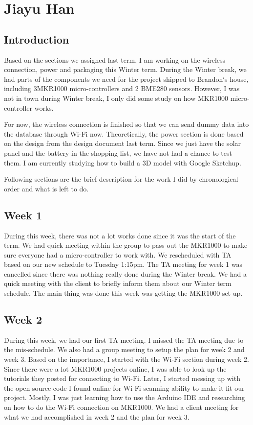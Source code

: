 \documentclass[IEEEtran,letterpaper,10pt,titlepage,fleqn,draftclsnofoot,onecolumn]{article}
\begin{document}
\section{Jiayu Han}
\subsection{Introduction}

Based on the sections we assigned last term, I am working on the wireless connection, power and packaging this Winter term. During the Winter break, we had parts of the components we need for the project shipped to Brandon`s house, including 3MKR1000 micro-controllers and 2 BME280 sensors. However, I was not in town during Winter break, I only did some study on how MKR1000 micro-controller works. 

For now, the wireless connection is finished so that we can send dummy data into the database through Wi-Fi now. Theoretically, the power section is done based on the design from the design document last term. Since we just have the solar panel and the battery in the shopping list, we have not had a chance to test them. I am currently studying how to build a 3D model with Google Sketchup.  

Following sections are the brief description for the work I did by chronological order and what is left to do.

\subsection{Week 1}

During this week, there was not a lot works done since it was the start of the term. We had quick meeting within the group to pass out the MKR1000 to make sure everyone had a micro-controller to work with. We rescheduled with TA based on our new schedule to Tuesday 1:15pm. The TA meeting for week 1 was cancelled since there was nothing really done during the Winter break. We had a quick meeting with the client to briefly inform them about our Winter term schedule. The main thing was done this week was getting the MKR1000 set up.

\subsection{Week 2}

During this week, we had our first TA meeting. I missed the TA meeting due to the mis-schedule. We also had a group meeting to setup the plan for week 2 and week 3. Based on the importance, I started with the Wi-Fi section during week 2. Since there were a lot MKR1000 projects online, I was able to look up the tutorials they posted for connecting to Wi-Fi. Later, I started messing up with the open source code I found online for Wi-Fi scanning ability to make it fit our project. Mostly, I was just learning how to use the Arduino IDE and researching on how to do the Wi-Fi connection on MKR1000. We had a client meeting for what we had accomplished in week 2 and the plan for week 3.
\end{document}
